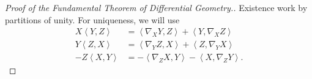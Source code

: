 \begin{proof}[Proof of the Fundamental Theorem of Differential Geometry.]
    Existence work by partitions of unity. For uniqueness, we will use
    \begin{align*}
        X \left\langle Y, Z \right\rangle &= \left\langle \nabla_X Y, Z \right\rangle + \left\langle Y, \nabla_X Z \right\rangle \\
        Y \left\langle Z, X \right\rangle &= \left\langle \nabla_Y Z, X \right\rangle + \left\langle Z, \nabla_Y X \right\rangle \\
        -Z \left\langle X, Y \right\rangle &= - \left\langle \nabla_Z X, Y \right\rangle - \left\langle X, \nabla_Z Y \right\rangle.
    \end{align*}

\end{proof}
